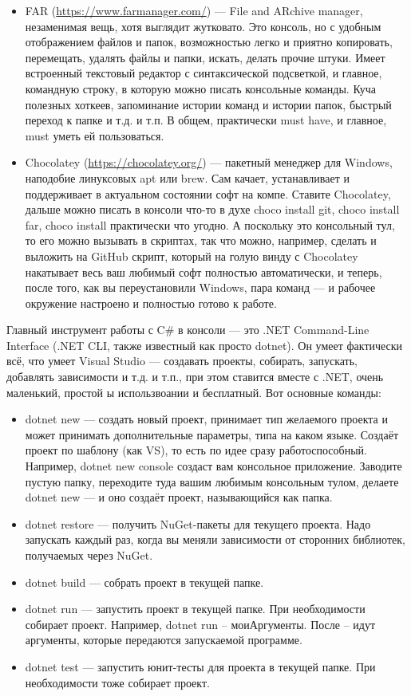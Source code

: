 \documentclass[a5paper]{article}
\begin{document}
\begin{itemize}
    \begin{itemize}
        \item FAR (\url{https://www.farmanager.com/}) --- File and ARchive manager, незаменимая вещь, хотя выглядит жутковато. Это консоль, но с удобным отображением файлов и папок, возможностью легко и приятно копировать, перемещать, удалять файлы и папки, искать, делать прочие штуки. Имеет встроенный текстовый редактор с синтаксической подсветкой, и главное, командную строку, в которую можно писать консольные команды. Куча полезных хоткеев, запоминание истории команд и истории папок, быстрый переход к папке и т.д. и т.п. В общем, практически must have, и главное, must уметь ей пользоваться.
        \item Chocolatey (\url{https://chocolatey.org/}) --- пакетный менеджер для Windows, наподобие линуксовых apt или brew. Сам качает, устанавливает и поддерживает в актуальном состоянии софт на компе. Ставите Chocolatey, дальше можно писать в консоли что-то в духе choco install git, choco install far, choco install практически что угодно. А поскольку это консольный тул, то его можно вызывать в скриптах, так что можно, например, сделать и выложить на GitHub скрипт, который на голую винду с Chocolatey накатывает весь ваш любимый софт полностью автоматически, и теперь, после того, как вы переустановили Windows, пара команд --- и рабочее окружение настроено и полностью готово к работе.
    \end{itemize}
\end{itemize}

Главный инструмент работы с C\# в консоли --- это .NET Command-Line Interface (.NET CLI, также известный как просто dotnet). Он умеет фактически всё, что умеет Visual Studio --- создавать проекты, собирать, запускать, добавлять зависимости и т.д. и т.п., при этом ставится вместе с .NET, очень маленький, простой ы использвоании и бесплатный. Вот основные команды:

\begin{itemize}
    \item dotnet new --- создать новый проект, принимает тип желаемого проекта и может принимать дополнительные параметры, типа на каком языке. Создаёт проект по шаблону (как VS), то есть по идее сразу работоспособный. Например, dotnet new console создаст вам консольное приложение. Заводите пустую папку, переходите туда вашим любимым консольным тулом, делаете dotnet new --- и оно создаёт проект, называющийся как папка.
    \item dotnet restore --- получить NuGet-пакеты для текущего проекта. Надо запускать каждый раз, когда вы меняли зависимости от сторонних библиотек, получаемых через NuGet.
    \item dotnet build --- собрать проект в текущей папке.
    \item dotnet run --- запустить проект в текущей папке. При необходимости собирает проект. Например, dotnet run -- моиАргументы. После -- идут аргументы, которые передаются запускаемой программе.
    \item dotnet test --- запустить юнит-тесты для проекта в текущей папке. При необходимости тоже собирает проект.
\end{itemize}
\end{document}
